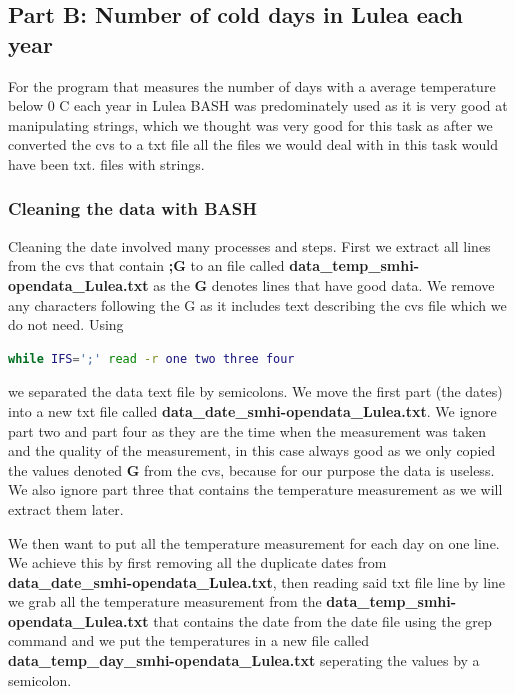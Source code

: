 \documentclass[a4paper]{article}
\begin{document}
\subsection{Part B: Number of cold days in Lulea each year}

For the program that measures the number of days with a average temperature below 0 C each year in Lulea BASH was predominately used as it is very good at manipulating strings,  which we thought was very good for this task as after we converted the cvs to a txt file all the files we would deal with in this task would have been txt. files with strings.
\subsubsection{Cleaning the data with BASH}
Cleaning the date involved many processes and steps.
First we extract all lines from the cvs that contain \textbf{;G} to an file called \textbf{data\_temp\_smhi-opendata\_Lulea.txt} as the \textbf{G} denotes lines that have good data. We remove any characters following the G as it includes text describing the cvs file which we do not need.
Using \begin{lstlisting}[language=Bash]
while IFS=';' read -r one two three four
\end{lstlisting}  we separated the data text file by semicolons. We move the first part (the dates) into a new txt file called \textbf{data\_date\_smhi-opendata\_Lulea.txt}. We ignore part two and part four as they are the time when the measurement was taken and the quality of the measurement, in this case always good as we only copied the values denoted \textbf{G} from the cvs, because for our purpose the data is useless. We also ignore part three that contains the temperature measurement as we will extract them later. 

We then want to put all the temperature measurement for each day on one line. We achieve this by first removing all the duplicate dates from \textbf{data\_date\_smhi-opendata\_Lulea.txt}, then reading said txt file line by line we grab all the temperature measurement from the \textbf{data\_temp\_smhi-opendata\_Lulea.txt} that contains the date from the date file using the grep command and we put the temperatures in a new file called \textbf{data\_temp\_day\_smhi-opendata\_Lulea.txt} seperating the values by a semicolon.
\end{document}
